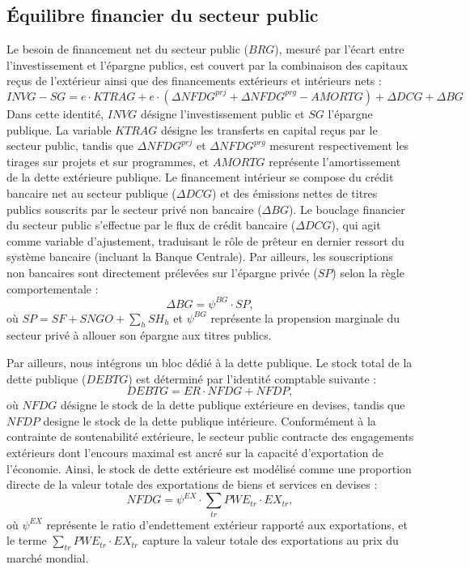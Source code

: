 \documentclass[11pt,a4paper]{article}
\newcommand{\tr}{\mathit{tr}}
\newcommand{\AMORTG}{\mathit{AMORTG}}
\newcommand{\BG}{\mathit{BG}}
\newcommand{\BRG}{\mathit{BRG}}
\newcommand{\DCG}{\mathit{DCG}}
\newcommand{\DEBTG}{\mathit{DEBTG}}
\newcommand{\ER}{\mathit{ER}}
\newcommand{\EX}{\mathit{EX}}
\newcommand{\INVG}{\mathit{INVG}}
\newcommand{\KTRAG}{\mathit{KTRAG}}
\newcommand{\NFDG}{\mathit{NFDG}}
\newcommand{\NFDP}{\mathit{NFDP}}
\newcommand{\PWE}{\mathit{PWE}}
\newcommand{\SF}{\mathit{SF}}
\newcommand{\SG}{\mathit{SG}}
\newcommand{\SH}{\mathit{SH}}
\newcommand{\SNGO}{\mathit{SNGO}}
\newcommand{\SP}{\mathit{SP}}
\begin{document}
	\subsection{Équilibre financier du secteur public}
	Le besoin de financement net du secteur public ($\BRG$), mesuré par l'écart entre l'investissement et l'épargne publics, est couvert par la combinaison des capitaux reçus de l'extérieur ainsi que des financements extérieurs et intérieurs nets :
	\begin{equation*}
		\INVG - \SG = e \cdot \KTRAG + e \cdot \left(\Delta\NFDG^{\mathit{prj}} +  \Delta\NFDG^{\mathit{prg}} - \AMORTG\right) + \Delta\DCG + \Delta\BG
	\end{equation*}
	Dans cette identité, $\INVG$ désigne l'investissement public et $\SG$ l'épargne publique. La variable $\KTRAG$ désigne les transferts en capital reçus par le secteur public, tandis que $\Delta\NFDG^{\mathit{prj}}$ et $\Delta\NFDG^{\mathit{prg}}$ mesurent respectivement les tirages sur projets et sur programmes, et $\AMORTG$ représente l'amortissement de la dette extérieure publique. Le financement intérieur se compose du crédit bancaire net au secteur publique ($\Delta\DCG$) et des émissions nettes de titres publics souscrits par le secteur privé non bancaire ($\Delta\BG$). Le bouclage financier du secteur public s'effectue par le flux de crédit bancaire ($\Delta\DCG$), qui agit comme variable d'ajustement, traduisant le rôle de prêteur en dernier ressort du système bancaire (incluant la Banque Centrale). Par ailleurs, les souscriptions non bancaires sont directement prélevées sur l'épargne privée ($\SP$) selon la règle comportementale :
	\begin{equation*}
		\Delta\BG = \psi^{\BG} \cdot \SP,
	\end{equation*}
	où $\SP = \SF + \SNGO + \sum_{h}\SH_h $ et $\psi^{\BG}$ représente la propension marginale du secteur privé à allouer son épargne aux titres publics.   
	
	
	Par ailleurs, nous intégrons un bloc dédié à la dette publique. Le stock total de la dette publique ($\DEBTG$) est déterminé par l'identité comptable suivante :
	\begin{equation}
		\DEBTG = \ER \cdot \NFDG + \NFDP,
	\end{equation} 
	où $\NFDG$ désigne le stock de la dette publique extérieure en devises, tandis que $\NFDP$ designe le stock de la dette publique intérieure. Conformément à la contrainte de soutenabilité extérieure, le secteur public contracte des engagements extérieurs dont l'encours maximal est ancré sur la capacité d'exportation de l'économie. Ainsi, le stock de dette extérieure est modélisé comme une proportion directe de la valeur totale des exportations de biens et services en devises :
	\begin{equation*}
		\NFDG = \psi^{\EX} \cdot \sum_{\tr} \PWE_{\tr} \cdot \EX_{\tr},
	\end{equation*} 
	où $\psi^{\EX}$ représente le ratio d'endettement extérieur rapporté aux exportations, et le terme $\sum_{\tr} \PWE_{\tr} \cdot \EX_{\tr}$ capture la valeur totale des exportations au prix du marché mondial.
	
\end{document}
